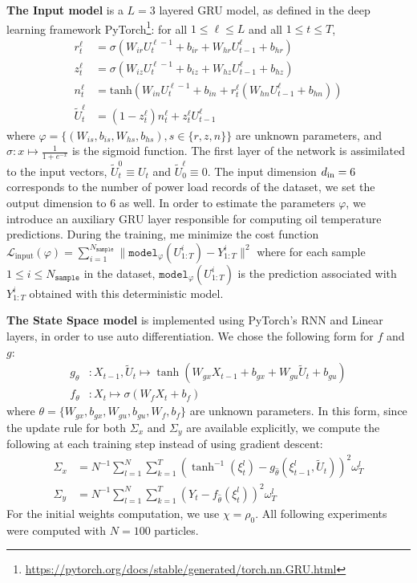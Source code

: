 \documentclass[journal]{IEEEtran}
\begin{document}
\textbf{The Input model} is a $L=3$ layered GRU model, as defined in the deep learning framework PyTorch\footnote{\href{https://pytorch.org/docs/stable/generated/torch.nn.GRU.html}{https://pytorch.org/docs/stable/generated/torch.nn.GRU.html}}: for all $1 \leq \ell \leq L$ and all $1 \leq t \leq T$,
\begin{align*}
	r^\ell_t        & = \sigma(W_{ir} U^{\ell - 1}_t + b_{ir} + W_{hr} U^{\ell}_{t-1} + b_{hr})                 \\
	z^\ell_t        & = \sigma(W_{iz} U^{\ell - 1}_t + b_{iz} + W_{hz} U^{\ell}_{t-1} + b_{hz})                 \\
	n^\ell_t        & = \mathrm{tanh}(W_{in} U^{\ell - 1}_t + b_{in} + r^\ell_t (W_{hn} U^\ell_{t-1} + b_{hn})) \\
	\tilde U^\ell_t & = (1-z^\ell_t) n^\ell_t+z^\ell_t U^\ell_{t-1}
\end{align*}
where $\varphi = \{(W_{is}, b_{is}, W_{hs}, b_{hs}), s \in \{r, z, n\}\}$ are unknown parameters, and $\sigma: x \mapsto \frac {1}{1+e^{-x}}$ is the sigmoid function.
The first layer of the network is assimilated to the input vectors, $\widetilde U_t^0 \equiv U_t$ and $\widetilde U^\ell_0 \equiv 0$.
The input dimension $d_\textnormal{in}=6$ corresponds to the number of power load records of the dataset, we set the output dimension to 6 as well.
In order to estimate the parameters $\varphi$, we introduce an auxiliary GRU layer responsible for computing oil temperature predictions.
During the training, me minimize the cost function $\mathcal{L}_{\mathrm{input}}(\varphi) = \sum_{i=1}^{N_{\texttt{sample}}} \|\texttt{model}_{\varphi}(U^i_{1:T}) - Y^i_{1:T}\|^2$ where for each sample $1 \leq i \leq N_{\texttt{sample}}$ in the dataset, $\texttt{model}_\varphi(U^i_{1:T})$ is the prediction associated with $Y^i_{1:T}$ obtained with this deterministic model.

\textbf{The State Space model} is implemented using PyTorch's RNN and Linear layers, in order to use auto differentiation.
We chose the following form for $f$ and $g$:
\begin{align*}
	g_\theta & : X_{t-1}, \widetilde U_t \mapsto \tanh(W_{gx} X_{t-1} + b_{gx} + W_{gu} \widetilde U_t + b_{gu}) \\
	f_\theta & : X_t \mapsto  \sigma(W_f X_t + b_f)
\end{align*}
where $\theta = \{W_{gx}, b_{gx}, W_{gu}, b_{gu}, W_f, b_f\}$ are unknown parameters.
In this form, since the update rule for both $\Sigma_x$ and $\Sigma_y$ are available explicitly, we compute the following at each training step instead of using gradient descent:
\begin{align*}
	\Sigma_x & = N^{-1} \sum_{l=1}^N \sum_{k=1}^T (\tanh^{-1}(\xi_t^l) - g_{\hat \theta}(\xi^l_{t-1}, \widetilde U_t))^2 \omega_T^l \\
	\Sigma_y & = N^{-1} \sum_{l=1}^N \sum_{k=1}^T (Y_t - f_{\hat \theta}(\xi^l_t))^2 \omega_T^l
\end{align*}
For the initial weights computation, we use $\chi = \rho_0$.
All following experiments were computed with $N=100$ particles.
\end{document}
